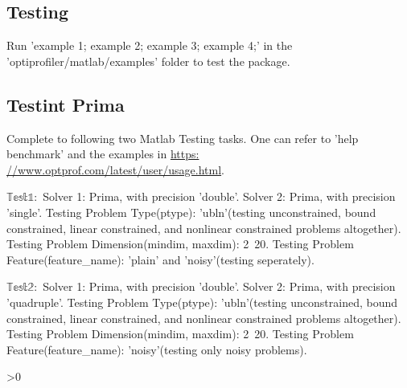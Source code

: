 \documentclass[12pt,a4paper,draft]{article}  %
\newcommand{\bibfile}{\jobname.bib}  %
\newcounter{cite}
\theoremstyle{definition}
\numberwithin{equation}{section}
\begin{document}
\subsection{Testing}
    Run 'example 1; example 2; example 3; example 4;' in the 'optiprofiler/matlab/examples' folder to test the package.

\subsection{Testint Prima}
Complete to following two Matlab Testing tasks. One can refer to 'help benchmark' and the examples in \url{https: //www.optprof.com/latest/user/usage.html}.

\(\mathbb{Test 1:}\)
Solver 1: Prima, with precision 'double'.
Solver 2: Prima, with precision 'single'.
Testing Problem Type(ptype): 'ubln'(testing unconstrained, bound constrained, linear constrained, and nonlinear constrained problems altogether).
Testing Problem Dimension(mindim, maxdim): 2~20.
Testing Problem Feature(feature_name): 'plain' and 'noisy'(testing seperately).

\(\mathbb{Test 2:}\)
Solver 1: Prima, with precision 'double'.
Solver 2: Prima, with precision 'quadruple'.
Testing Problem Type(ptype): 'ubln'(testing unconstrained, bound constrained, linear constrained, and nonlinear constrained problems altogether).
Testing Problem Dimension(mindim, maxdim): 2~20.
Testing Problem Feature(feature_name): 'noisy'(testing only noisy problems).

\ifnum\value{cite}>0
    \small
    
    
\fi

\end{document}
